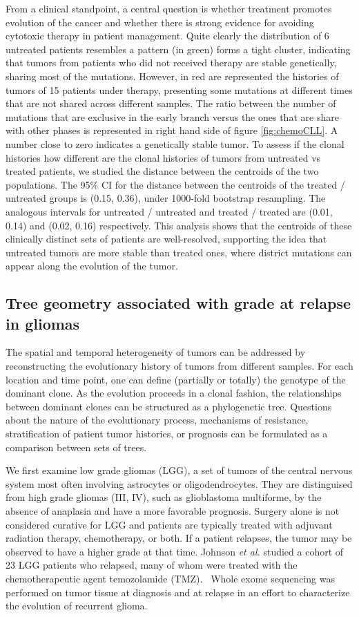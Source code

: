 \documentclass[a4paper,11pt]{article}
\begin{document}
From a clinical standpoint, a central question is whether treatment promotes evolution of the cancer and whether there is strong evidence for avoiding cytotoxic therapy in patient management.
Quite clearly the distribution of 6 untreated patients resembles a pattern (in green) forms a tight cluster, indicating that tumors from patients who did not received therapy are stable genetically, sharing most of the mutations.
However, in red are represented the histories of tumors of 15 patients under therapy, presenting some mutations at different times that are not shared across different samples.
The ratio between the number of mutations that are exclusive in the early branch versus the ones that are share with other phases is represented in right hand side of figure \ref{fig:chemoCLL}.
A number close to zero indicates a genetically stable tumor.
To assess if the clonal histories how different are the clonal histories of tumors from untreated vs treated patients, we studied the distance between the centroids of the two populations.
The 95\% CI for the distance between the centroids of the treated / untreated groups is (0.15, 0.36), under 1000-fold bootstrap resampling.
The analogous intervals for untreated / untreated and treated / treated are (0.01, 0.14) and (0.02, 0.16) respectively.
This analysis shows that the centroids of these clinically distinct sets of patients are well-resolved, supporting the idea that untreated tumors are more stable than treated ones, where district mutations can appear along the evolution of the tumor.

\subsection{Tree geometry associated with grade at relapse in gliomas}

The spatial and temporal heterogeneity of tumors can be addressed by reconstructing the evolutionary history of tumors from different samples.
For each location and time point, one can define (partially or totally) the genotype of the dominant clone.
As the evolution proceeds in a clonal fashion, the relationships between dominant clones can be structured as a phylogenetic tree.
Questions about the nature of the evolutionary process, mechanisms of resistance, stratification of patient tumor histories, or prognosis can be formulated as a comparison between sets of trees.

We first examine low grade gliomas (LGG), a set of tumors of the central nervous system most often involving astrocytes or oligodendrocytes.
They are distinguised from high grade gliomas (III, IV), such as glioblastoma multiforme, by the absence of anaplasia and have a more favorable prognosis.
Surgery alone is not considered curative for LGG and patients are typically treated with adjuvant radiation therapy, chemotherapy, or both.
If a patient relapses, the tumor may be observed to have a higher grade at that time.
Johnson \textit{et al.} studied a cohort of 23 LGG patients who relapsed, many of whom were treated with the chemotherapeutic agent temozolamide (TMZ).~\cite{johnson2014mutational}
Whole exome sequencing was performed on tumor tissue at diagnosis and at relapse in an effort to characterize the evolution of recurrent glioma.
\end{document}
